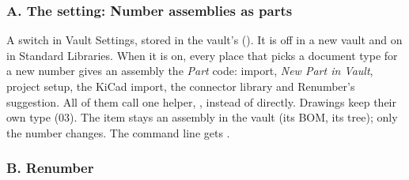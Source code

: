 \subsubsection*{A. The setting: Number assemblies as parts}

A switch in Vault Settings, stored in the vault's  (). It
is off in a new vault and on in Standard Libraries. When it is on, every place that picks a document type for a new
number gives an assembly the \emph{Part} code: import, \emph{New Part in Vault}, project setup, the KiCad import,
the connector library and Renumber's suggestion. All of them call one helper,
, instead of  directly.
Drawings keep their own type (03). The item stays an assembly in the vault (its BOM, its tree); only the number
changes. The command line gets .

\subsubsection*{B. Renumber}


